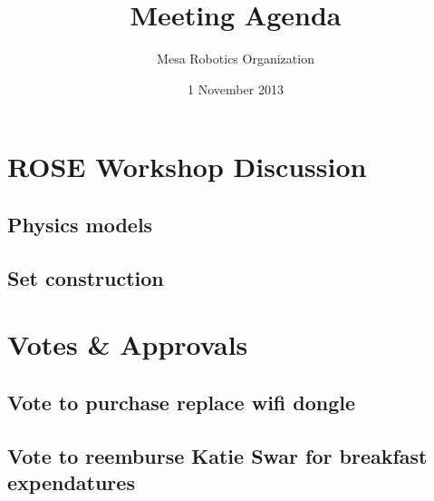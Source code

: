 \documentclass{article}
\begin{document}

\title{Meeting Agenda}
\author{Mesa Robotics Organization}
\date{1 November 2013}

\maketitle

\section{ROSE Workshop Discussion}
\subsection{Physics models}
\subsection{Set construction}

\section{Votes \& Approvals}
\subsection{Vote to purchase replace wifi dongle}
\subsection{Vote to reemburse Katie Swar for breakfast expendatures}

\end{document}
